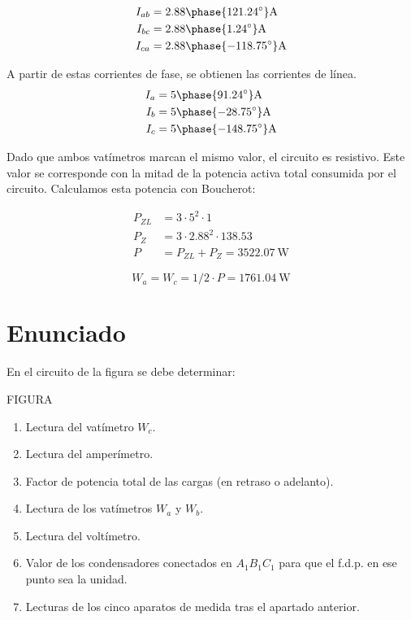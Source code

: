 \begin{align*}
  I_{ab} &= {2.88\phase{121.24^\circ}}\unit{\ampere}\\
  I_{bc} &= {2.88\phase{1.24^\circ}}\unit{\ampere}\\
  I_{ca} &= {2.88\phase{-118.75^\circ}}\unit{\ampere}\\
\end{align*}

A partir de estas corrientes de fase, se obtienen las corrientes de línea.
\begin{align*}
  I_{a} &= {5\phase{91.24^\circ}}\unit{\ampere}\\
  I_{b} &= {5\phase{-28.75^\circ}}\unit{\ampere}\\
  I_{c} &= {5\phase{-148.75^\circ}}\unit{\ampere}
\end{align*}



Dado que ambos vatímetros marcan el mismo valor, el circuito es
resistivo. Este valor se corresponde con la mitad de la potencia
activa total consumida por el circuito. Calculamos esta potencia con Boucherot:


\begin{align*}
  P_{ZL} &= 3 \cdot 5^2 \cdot 1\\
  P_Z &= 3 \cdot 2.88^2 \cdot 138.53\\
  P &= P_{ZL} + P_{Z} = \SI{3522.07}{\watt}
\end{align*}

\[
  W_a = W_c = 1/2 \cdot P = \SI{1761.04}{\watt}
\]



\section{Enunciado}

En el circuito de la figura se debe determinar:

\begin{center}
  FIGURA
\end{center}

\begin{enumerate}
\item Lectura del vatímetro $W_c$.
\item Lectura del amperímetro.
\item Factor de potencia total de las cargas (en retraso o
  adelanto).
\item Lectura de los vatímetros $W_a$ y $W_b$.
\item Lectura del voltímetro.
\item Valor de los condensadores conectados en $A_1B_1C_1$ para
  que el f.d.p. en ese punto sea la unidad.
\item Lecturas de los cinco aparatos de medida tras el apartado
  anterior.
\end{enumerate}

